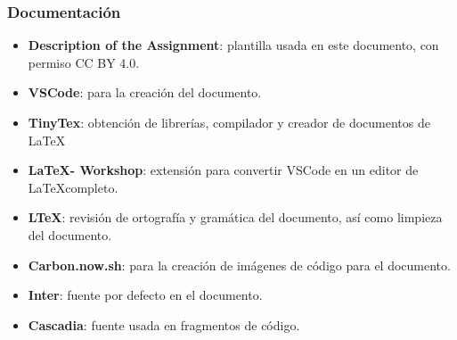 \documentclass[12pt]{article}
\begin{document}
        \subsubsection{Documentación}

            \begin{itemize}                
                \item \textbf{Description of the Assignment}: \cite{template} plantilla usada en este documento, con permiso CC BY 4.0.
                \item \textbf{VSCode}: \cite{vscode} para la creación del documento.
                \item \textbf{TinyTex}: \cite{tinytex} obtención de librerías, compilador y creador de documentos de \LaTeX
                \item \textbf{\LaTeX - Workshop}: \cite{workshop} extensión para convertir VSCode en un editor de \LaTeX completo.
                \item \textbf{LTeX}: \cite{ltex} revisión de ortografía y gramática del documento, así como limpieza del documento.
                \item \textbf{Carbon.now.sh}: \cite{carbon} para la creación de imágenes de código para el documento.

                \item \textbf{Inter}: \cite{inter} fuente por defecto en el documento. 
                \item \textbf{Cascadia}: \cite{cascadia} fuente usada en fragmentos de código.

    \newpage

\end{itemize}
\end{document}
